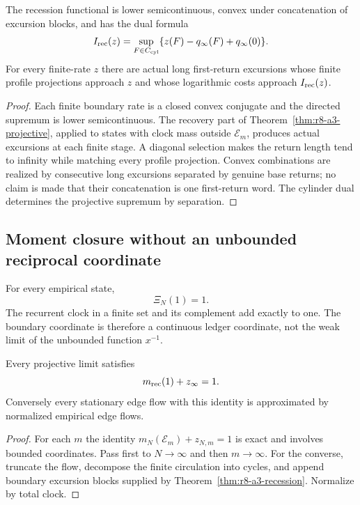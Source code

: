 \begin{theorem}
\label{thm:r8-a3-recession}
The recession functional is lower semicontinuous, convex under concatenation of
excursion blocks, and has the dual formula
\[
 I_{\rm rec}(z)=\sup_{F\in C_{\rm cyl}}
 \{z(F)-q_\infty(F)+q_\infty(0)\}.
\]
For every finite-rate $z$ there are actual long first-return excursions whose
finite profile projections approach $z$ and whose logarithmic costs approach
$I_{\rm rec}(z)$.
\end{theorem}

\begin{proof}
Each finite boundary rate is a closed convex conjugate and the directed
supremum is lower semicontinuous.  The recovery part of
Theorem~\ref{thm:r8-a3-projective}, applied to states with clock mass outside
$\mathcal E_m$, produces actual excursions at each finite stage.  A diagonal
selection makes the return length tend to infinity while matching every
profile projection.  Convex combinations are realized by consecutive long
excursions separated by genuine base returns; no claim is made that their
concatenation is one first-return word.  The cylinder dual determines the
projective supremum by separation.
\end{proof}

\subsection{Moment closure without an unbounded reciprocal coordinate}

For every empirical state,
\[
 \Xi_N(1)=1.
\]
The recurrent clock in a finite set and its complement add exactly to one.
The boundary coordinate is therefore a continuous ledger coordinate, not the
weak limit of the unbounded function $x^{-1}$.

\begin{lemma}
\label{lem:r8-a3-normalization}
Every projective limit satisfies
\[
 m_{\rm rec}(1)+z_\infty=1.
\]
Conversely every stationary edge flow with this identity is approximated by
normalized empirical edge flows.
\end{lemma}

\begin{proof}
For each $m$ the identity
$m_{N}(\mathcal E_m)+z_{N,m}=1$ is exact and involves bounded coordinates.
Pass first to $N\to\infty$ and then $m\to\infty$.  For the converse, truncate
the flow, decompose the finite circulation into cycles, and append boundary
excursion blocks supplied by Theorem~\ref{thm:r8-a3-recession}.  Normalize by
total clock.
\end{proof}

